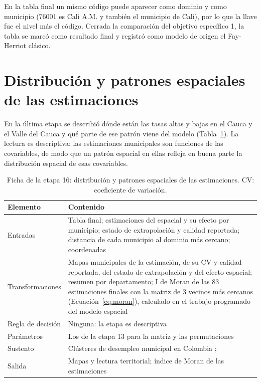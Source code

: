 En la tabla final un mismo código puede aparecer como dominio y como municipio (76001 es Cali A.M. y también el municipio de Cali), por lo que la llave fue el nivel más el código. Cerrada la comparación del objetivo específico 1, la tabla se marcó como resultado final y registró como modelo de origen el Fay-Herriot clásico.

\section{Distribución y patrones espaciales de las estimaciones}
\label{sec:met_patrones}

En la última etapa se describió dónde están las tasas altas y bajas en el Cauca y el Valle del Cauca y qué parte de ese patrón viene del modelo (Tabla~\ref{tab:met_patrones}). La lectura es descriptiva: las estimaciones municipales son funciones de las covariables, de modo que un patrón espacial en ellas refleja en buena parte la distribución espacial de esas covariables.

\begin{table}[!htbp]
\centering
\small
\caption[Ficha de la etapa 16: distribución y patrones espaciales de las estimaciones]{Ficha de la etapa 16: distribución y patrones espaciales de las estimaciones. CV: coeficiente de variación.}
\label{tab:met_patrones}
\renewcommand{\arraystretch}{1.15}
\begin{tabularx}{\linewidth}{>{\raggedright\arraybackslash}p{2.8cm} >{\raggedright\arraybackslash}X}
\toprule
Elemento & Contenido \\
\midrule
Entradas & Tabla final; estimaciones del espacial y su efecto por municipio; estado de extrapolación y calidad reportada; distancia de cada municipio al dominio más cercano; coordenadas \\
Transformaciones & Mapas municipales de la estimación, de su CV y calidad reportada, del estado de extrapolación y del efecto espacial; resumen por departamento; I de Moran de las 83 estimaciones finales con la matriz de 3 vecinos más cercanos (Ecuación~\ref{eq:moran}), calculado en el trabajo programado del modelo espacial \\
Regla de decisión & Ninguna: la etapa es descriptiva \\
Parámetros & Los de la etapa 13 para la matriz y las permutaciones \\
Sustento & Clústeres de desempleo municipal en Colombia \cite[pp.~123--124]{Diaz2016}; \cite{Moran1950} \\
Salida & Mapas y lectura territorial; índice de Moran de las estimaciones \\
\bottomrule
\end{tabularx}
\end{table}

